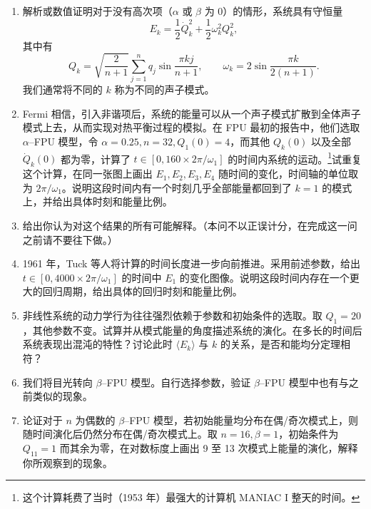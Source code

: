 \begin{enumerate}[label=\arabic*.]
\item 解析或数值证明对于没有高次项（$\alpha$ 或 $\beta$ 为 0）的情形，系统具有守恒量
\begin{equation}
E_k=\frac12\dot Q_k^2+\frac12\omega_k^2Q_k^2,
\tag{3}
\end{equation}
其中有
\begin{equation}
Q_k=\sqrt{\frac{2}{n+1}}\sum_{j=1}^{n}q_j\sin\frac{\pi k j}{n+1},\qquad
\omega_k=2\sin\frac{\pi k}{2(n+1)}.
\tag{4}
\end{equation}
我们通常将不同的 $k$ 称为不同的声子模式。

\item Fermi 相信，引入非谐项后，系统的能量可以从一个声子模式扩散到全体声子模式上去，从而实现对热平衡过程的模拟。在 FPU 最初的报告中，他们选取 $\alpha$--FPU 模型，令 $\alpha=0.25,n=32,Q_1(0)=4$，而其他 $Q_k(0)$ 以及全部 $\dot Q_k(0)$ 都为零，计算了 $t\in[0,160\times2\pi/\omega_1]$ 的时间内系统的运动。\footnote{这个计算耗费了当时（1953 年）最强大的计算机 MANIAC I 整天的时间。}试重复这个计算，在同一张图上画出 $E_1,E_2,E_3,E_4$ 随时间的变化，时间轴的单位取为 $2\pi/\omega_1$。说明这段时间内有一个时刻几乎全部能量都回到了 $k=1$ 的模式上，并给出具体时刻和能量比例。

\item 给出你认为对这个结果的所有可能解释。（本问不以正误计分，在完成这一问之前请不要往下做。）

\item 1961 年，Tuck 等人将计算的时间长度进一步向前推进。采用前述参数，给出 $t\in[0,4000\times2\pi/\omega_1]$ 的时间中 $E_1$ 的变化图像。说明这段时间内存在一个更大的回归周期，给出具体的回归时刻和能量比例。

\item 非线性系统的动力学行为往往强烈依赖于参数和初始条件的选取。取 $Q_1=20$，其他参数不变。试算并从模式能量的角度描述系统的演化。在多长的时间后系统表现出混沌的特性？讨论此时 $\langle E_k\rangle$ 与 $k$ 的关系，是否和能均分定理相符？

\item 我们将目光转向 $\beta$--FPU 模型。自行选择参数，验证 $\beta$--FPU 模型中也有与之前类似的现象。

\item 论证对于 $n$ 为偶数的 $\beta$--FPU 模型，若初始能量均分布在偶/奇次模式上，则随时间演化后仍然分布在偶/奇次模式上。取 $n=16,\beta=1$，初始条件为 $Q_{11}=1$ 而其余为零，在对数标度上画出 9 至 13 次模式上能量的演化，解释你所观察到的现象。


\end{enumerate}
